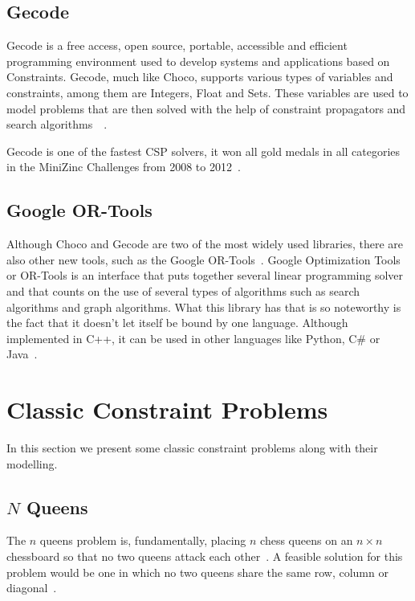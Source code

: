 \subsection{Gecode}

Gecode is a free access, open source, portable, accessible and efficient programming environment used to develop systems and applications based on Constraints. Gecode, much like Choco, supports various types of variables and constraints, among them are Integers, Float and Sets. These variables are used to model problems that are then solved with the help of constraint propagators and search algorithms~\cite{schulte2010modeling}~\cite{gecode}.

Gecode is one of the fastest \ac{CSP} solvers, it won all gold medals in all categories in the MiniZinc Challenges from 2008 to 2012~\cite{gecode}.

\subsection{Google OR-Tools}

Although Choco and Gecode are two of the most widely used libraries, there are also other new tools, such as the Google OR-Tools~\cite{ORTools}. Google Optimization Tools or OR-Tools is an interface that puts together several linear programming solver and that counts on the use of several types of algorithms such as search algorithms and graph algorithms. What this library has that is so noteworthy is the fact that it doesn't let itself be bound by one language. Although implemented in C++, it can be used in other languages like Python, C\# or Java~\cite{ORTools}.

\section{Classic Constraint Problems}

In this section we present some classic constraint problems along with their modelling.

\subsection{$N$ Queens}
\label{nqueens}

The $n$ queens problem is, fundamentally, placing $n$ chess queens on an $n \times n$ chessboard so that no two queens attack each other~\cite{rivin1994n}. A feasible solution for this problem would be one in which no two queens share the same row, column or diagonal~\cite{hoffman1969constructions}.

